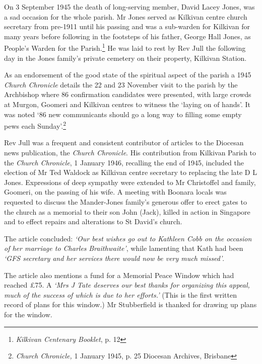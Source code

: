On 3 September 1945 the death of long-serving member, David Lacey Jones, was a sad occasion for the whole parish. Mr Jones served as Kilkivan centre church secretary from pre-1911 until his passing and was a sub-warden for Kilkivan for many years before following in the footsteps of his father, George Hall Jones, as People's Warden for the Parish.\footnote{\emph{Kilkivan Centenary Booklet}, p. 12} He was laid to rest by Rev Jull the following day in the Jones family's private cemetery on their property, Kilkivan Station.


As an endorsement of the good state of the spiritual aspect of the parish a 1945 \emph{Church Chronicle} details the 22 and 23 November visit to the parish by the Archbishop where 86 confirmation candidates were presented, with large crowds at Murgon, Goomeri and Kilkivan centres to witness the `laying on of hands'. It was noted `86 new communicants should go a long way to filling some empty pews each Sunday'.\footnote{\emph{Church Chronicle,} 1 January 1945, p. 25 Diocesan Archives, Brisbane}


Rev Jull was a frequent and consistent contributor of articles to the Diocesan news publication, the \emph{Church Chronicle}. His contribution from Kilkivan Parish to the \emph{Church Chronicle}, 1 January 1946, recalling the end of 1945, included the election of Mr Ted Waldock as Kilkivan centre secretary to replacing the late D L Jones. Expressions of deep sympathy were extended to Mr Christoffel and family, Goomeri, on the passing of his wife. A meeting with Boonara locals was requested to discuss the Mander-Jones family's generous offer to erect gates to the church as a memorial to their son John (Jack), killed in action in Singapore and to effect repairs and alterations to St David's church.



The article concluded: \emph{`Our best wishes go out to Kathleen Cobb on the occasion of her marriage to Charles} \emph{Braithwaite'}, while lamenting that Kath had been \emph{`GFS secretary and her services there would now be very much missed'}.



The article also mentions a fund for a Memorial Peace Window which had reached \pounds75. A \emph{`Mrs J Tate deserves our best thanks for organizing this appeal, much of the success of which is due to her efforts.'} (This is the first written record of plans for this window.) Mr Stubberfield is thanked for drawing up plans for the window.



